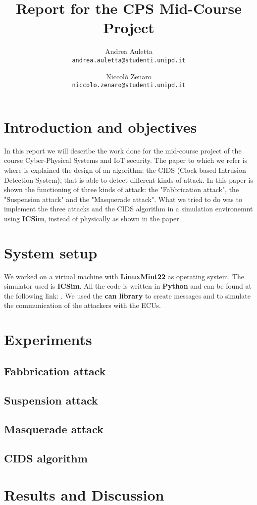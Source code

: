 \documentclass[12pt]{article}
\title{Report for the CPS Mid-Course Project}
\author{
    Andrea Auletta \\ \texttt{andrea.auletta@studenti.unipd.it} \and
    Niccolò Zenaro \\ \texttt{niccolo.zenaro@studenti.unipd.it}
}
\begin{document}
\maketitle
\newpage
\tableofcontents
\newpage

\section{Introduction and objectives}
In this report we will describe the work done for the mid-course project of the course Cyber-Physical Systems and IoT security. 
The paper to which we refer is \textbf{\cite{Cho2016} } where is explained the design of an algorithm: the CIDS (Clock-based Intrusion Detection System), that is able to detect different kinds of attack. In this paper is shown the functioning of three kinds of attack: the "Fabbrication attack", the "Suspension attack" and the "Masquerade attack". What we tried to do was to implement the three attacks and the CIDS algorithm in a simulation environemnt using \textbf{ICSim}, instead of physically as shown in the paper.
\section{System setup}
We worked on a virtual machine with \textbf{LinuxMint22} as operating system.
The simulator used is \textbf{ICSim}. All the code is written in \textbf{Python} and can be found at the following link: .%
We used the \textbf{can library} to create messages and to simulate the communication of the attackers with the ECUs.
\section{Experiments}
\subsection{Fabbrication attack}
\subsection{Suspension attack}
\subsection{Masquerade attack}
\subsection{CIDS algorithm}
\section{Results and Discussion}
\printbibliography 
\end{document}
